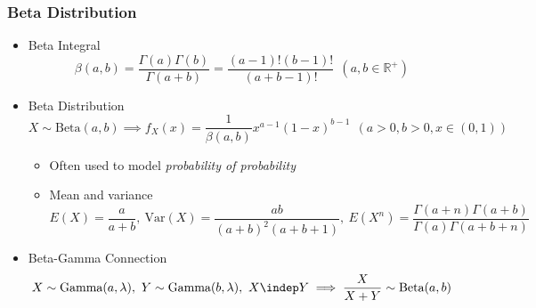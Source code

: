 \subsubsection*{Beta Distribution}
\begin{itemize}
    \item Beta Integral
    \begin{equation}
        \beta(a,b)=\frac{\Gamma(a)\Gamma(b)}{\Gamma(a+b)}=\frac{(a-1)!(b-1)!}{(a+b-1)!}~~(a,b\in\mathbb{R^+})
    \end{equation}
    \item Beta Distribution
    \begin{equation}
        X\sim\text{Beta}(a,b)\implies f_X(x)=\frac{1}{\beta(a,b)}x^{a-1}(1-x)^{b-1}~~(a>0,b>0,x\in(0,1))
    \end{equation}
    \begin{itemize}
        \item Often used to model \textit{probability of probability}
        \item Mean and variance
        \begin{equation}
            E(X)=\frac{a}{a+b},~\text{Var}(X)=\frac{ab}{(a+b)^2(a+b+1)},~E\left(X^n\right)=\frac{\Gamma(a+n)\Gamma(a+b)}{\Gamma(a)\Gamma(a+b+n)}
        \end{equation}
    \end{itemize}
    \item Beta-Gamma Connection
    \begin{equation}
        X\sim\text{Gamma}(a,\lambda),~Y\sim\text{Gamma}(b,\lambda),~X\indep Y\implies\frac{X}{X+Y}\sim\text{Beta}(a,b)
    \end{equation}
\end{itemize}
\begin{figures}
\end{figures}

